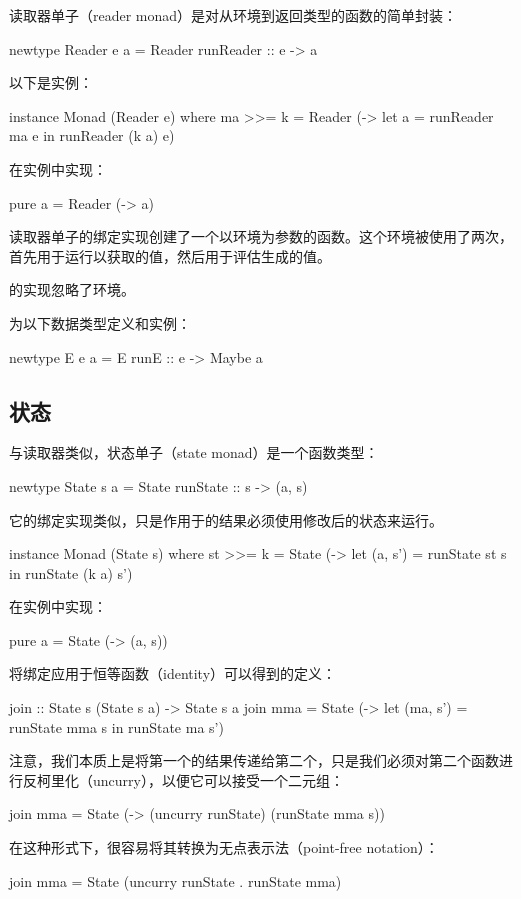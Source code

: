 \documentclass[DaoFP]{subfiles}
\begin{document}
读取器单子（reader monad）是对从环境到返回类型的函数的简单封装：
\begin{haskell}
newtype Reader e a = Reader { runReader :: e -> a }
\end{haskell}
以下是实例：
\begin{haskell}
instance Monad (Reader e) where
  ma >>= k = Reader (\e -> let a = runReader ma e
                           in runReader (k a) e)
\end{haskell}

在实例中实现：
\begin{haskell}
  pure a = Reader (\e -> a)
\end{haskell}
读取器单子的绑定实现创建了一个以环境为参数的函数。这个环境被使用了两次，首先用于运行以获取的值，然后用于评估生成的值。

的实现忽略了环境。

\begin{exercise}
为以下数据类型定义和实例：
\begin{haskell}
newtype E e a = E { runE :: e -> Maybe a }
\end{haskell}
\end{exercise}

\subsection{状态}
与读取器类似，状态单子（state monad）是一个函数类型：
\begin{haskell}
newtype State s a = State { runState :: s -> (a, s) }
\end{haskell}
它的绑定实现类似，只是作用于的结果必须使用修改后的状态来运行。
\begin{haskell}
instance Monad (State s) where
  st >>= k = State (\s -> let (a, s') = runState st s
                          in runState (k a) s')
\end{haskell}
在实例中实现：
\begin{haskell}
  pure a = State (\s -> (a, s))
\end{haskell}

将绑定应用于恒等函数（identity）可以得到的定义：
\begin{haskell}
join :: State s (State s a) -> State s a
join mma = State (\s -> let (ma, s') = runState mma s
                        in runState ma s')
\end{haskell}
注意，我们本质上是将第一个的结果传递给第二个，只是我们必须对第二个函数进行反柯里化（uncurry），以便它可以接受一个二元组：
\begin{haskell}
join mma = State (\s -> (uncurry runState) (runState mma s))
\end{haskell}
在这种形式下，很容易将其转换为无点表示法（point-free notation）：
\begin{haskell}
join mma = State (uncurry runState . runState mma)
\end{haskell}
\end{document}
